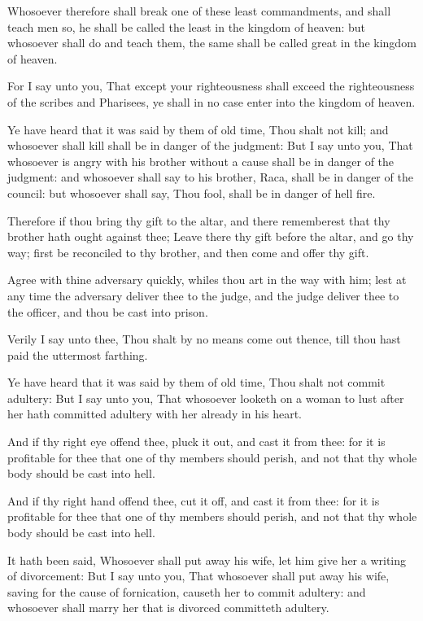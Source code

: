 \Verse Whosoever therefore shall break one of these least commandments, and shall teach men so, he shall be called the least in the kingdom of heaven: but whosoever shall do and teach them, the same shall be called great in the kingdom of heaven.

\Verse For I say unto you, That except your righteousness shall exceed the righteousness of the scribes and Pharisees, ye shall in no case enter into the kingdom of heaven.

\Verse Ye have heard that it was said by them of old time, Thou shalt not kill; and whosoever shall kill shall be in danger of the judgment: \Verse But I say unto you, That whosoever is angry with his brother without a cause shall be in danger of the judgment: and whosoever shall say to his brother, Raca, shall be in danger of the council: but whosoever shall say, Thou fool, shall be in danger of hell fire.

\Verse Therefore if thou bring thy gift to the altar, and there rememberest that thy brother hath ought against thee; \Verse Leave there thy gift before the altar, and go thy way; first be reconciled to thy brother, and then come and offer thy gift.

\Verse Agree with thine adversary quickly, whiles thou art in the way with him; lest at any time the adversary deliver thee to the judge, and the judge deliver thee to the officer, and thou be cast into prison.

\Verse Verily I say unto thee, Thou shalt by no means come out thence, till thou hast paid the uttermost farthing.

\Verse Ye have heard that it was said by them of old time, Thou shalt not commit adultery: \Verse But I say unto you, That whosoever looketh on a woman to lust after her hath committed adultery with her already in his heart.

\Verse And if thy right eye offend thee, pluck it out, and cast it from thee: for it is profitable for thee that one of thy members should perish, and not that thy whole body should be cast into hell.

\Verse And if thy right hand offend thee, cut it off, and cast it from thee: for it is profitable for thee that one of thy members should perish, and not that thy whole body should be cast into hell.

\Verse It hath been said, Whosoever shall put away his wife, let him give her a writing of divorcement: \Verse But I say unto you, That whosoever shall put away his wife, saving for the cause of fornication, causeth her to commit adultery: and whosoever shall marry her that is divorced committeth adultery.

